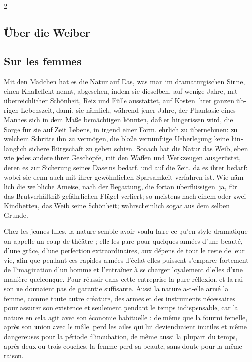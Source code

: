 \documentclass[a4paper,12pt]{article}
\newcommand\chunks[2]{%
\begin{leftcolumn*}\begin{otherlanguage}{german}%
{#1}%
\end{otherlanguage}\end{leftcolumn*}%
\begin{rightcolumn}\begin{otherlanguage}{french}%
{#2}%
\end{otherlanguage}\end{rightcolumn}%
}
\begin{document}
\thispagestyle{empty}
\setlength{\columnsep}{8mm}
\setlength{\columnseprule}{0.4pt}

\begin{paracol}{2}
  \chunks{\section*{Über die Weiber}}
         {\section*{Sur les femmes}}

  \chunks{\textelp{}}
         {\textelp{}}
  \chunks{Mit den Mädchen hat es die Natur auf Das, was man im dramaturgischen Sinne, einen Knalleffekt nennt, abgesehen, indem sie dieselben, auf wenige Jahre, mit überreichlicher Schönheit, Reiz und Fülle ausstattet, auf Kosten ihrer ganzen übrigen Lebenszeit, damit sie nämlich, während jener Jahre, der Phantasie eines Mannes sich in dem Maße bemächtigen könnten, daß er hingerissen wird, die Sorge für sie auf Zeit Lebens, in irgend einer Form, ehrlich zu übernehmen; zu welchem Schritte ihn zu vermögen, die bloße vernünftige Ueberlegung keine hinlänglich sichere Bürgschaft zu geben schien. Sonach hat die Natur das Weib, eben wie jedes andere ihrer Geschöpfe, mit den Waffen und Werkzeugen ausgerüstet, deren es zur Sicherung seines Daseins bedarf, und auf die Zeit, da es ihrer bedarf; wobei sie denn auch mit ihrer gewöhnlichen Sparsamkeit verfahren ist. Wie nämlich die weibliche Ameise, nach der Begattung, die fortan überflüssigen, ja, für das Brutverhältniß gefährlichen Flügel verliert; so meistens nach einem oder zwei Kindbetten, das Weib seine Schönheit; wahrscheinlich sogar aus dem selben Grunde.}
         {Chez les jeunes filles, la nature semble avoir voulu faire ce qu’en style dramatique on appelle un coup de théâtre ; elle les pare pour quelques années d’une beauté, d’une grâce, d’une perfection extraordinaires, aux dépens de tout le reste de leur vie, afin que pendant ces rapides années d’éclat elles puissent s’emparer fortement de l’imagination d’un homme et l’entraîner à se charger loyalement d’elles d’une manière quelconque. Pour réussir dans cette entreprise la pure réflexion et la raison ne donnaient pas de garantie suffisante. Aussi la nature a-t-elle armé la femme, comme toute autre créature, des armes et des instruments nécessaires pour assurer son existence et seulement pendant le temps indispensable, car la nature en cela agit avec son économie habituelle : de même que la fourmi femelle, après son union avec le mâle, perd les ailes qui lui deviendraient inutiles et même dangereuses pour la période d’incubation, de même aussi la plupart du temps, après deux ou trois couches, la femme perd sa beauté, sans doute pour la même raison.}

\end{paracol}
\end{document}
